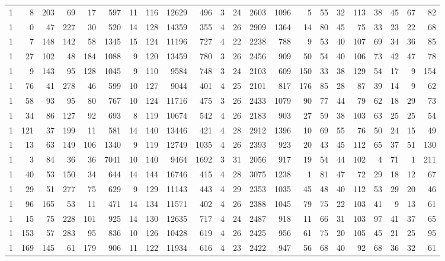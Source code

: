{\begin{landscape}
\begin{longtable}[c]{lrrrrrrrrrrrrrrrrrrrrr}
1 & 8 & 203 & 69 & 17 & 597 & 11 & 116 & 12629 & 496 & 3 & 24 & 2603 & 1096 & 5 & 55 & 32 & 113 & 38 & 45 & 67 & 82 \\
1 & 0 & 47 & 227 & 30 & 520 & 14 & 128 & 14359 & 355 & 4 & 26 & 2909 & 1364 & 14 & 80 & 45 & 75 & 33 & 23 & 22 & 68 \\
1 & 7 & 148 & 142 & 58 & 1345 & 15 & 124 & 11196 & 727 & 4 & 22 & 2238 & 788 & 9 & 53 & 40 & 107 & 69 & 34 & 36 & 85 \\
1 & 27 & 102 & 48 & 184 & 1088 & 9 & 120 & 13459 & 780 & 3 & 26 & 2456 & 909 & 50 & 54 & 40 & 106 & 73 & 42 & 47 & 78 \\
1 & 9 & 143 & 95 & 128 & 1045 & 9 & 110 & 9584 & 748 & 3 & 24 & 2103 & 609 & 150 & 33 & 38 & 129 & 54 & 17 & 9 & 154 \\
1 & 76 & 41 & 278 & 46 & 599 & 10 & 127 & 9044 & 401 & 4 & 25 & 2101 & 817 & 176 & 85 & 28 & 87 & 39 & 14 & 9 & 62 \\
1 & 58 & 93 & 95 & 80 & 767 & 10 & 124 & 11716 & 475 & 3 & 26 & 2433 & 1079 & 90 & 77 & 44 & 79 & 62 & 18 & 29 & 73 \\
1 & 34 & 86 & 127 & 92 & 693 & 8 & 119 & 10674 & 542 & 4 & 26 & 2183 & 903 & 27 & 59 & 38 & 103 & 63 & 25 & 25 & 54 \\
1 & 121 & 37 & 199 & 11 & 581 & 14 & 140 & 13446 & 421 & 4 & 28 & 2912 & 1396 & 10 & 69 & 55 & 76 & 50 & 24 & 15 & 49 \\
1 & 13 & 63 & 149 & 106 & 1340 & 9 & 119 & 12749 & 1035 & 4 & 26 & 2393 & 923 & 20 & 43 & 45 & 112 & 65 & 37 & 51 & 130 \\
1 & 3 & 84 & 36 & 36 & 7041 & 10 & 140 & 9464 & 1692 & 3 & 31 & 2056 & 917 & 19 & 54 & 44 & 102 & 4 & 71 & 1 & 211 \\
1 & 40 & 53 & 150 & 34 & 644 & 14 & 144 & 16746 & 415 & 4 & 28 & 3075 & 1238 & 1 & 81 & 47 & 72 & 29 & 18 & 12 & 67 \\
1 & 29 & 51 & 277 & 75 & 629 & 9 & 129 & 11143 & 443 & 4 & 29 & 2353 & 1035 & 45 & 48 & 40 & 112 & 53 & 29 & 20 & 46 \\
1 & 96 & 165 & 53 & 11 & 471 & 14 & 134 & 11571 & 402 & 4 & 26 & 2388 & 1045 & 79 & 75 & 22 & 103 & 41 & 9 & 13 & 61 \\
1 & 15 & 75 & 228 & 101 & 925 & 14 & 130 & 12635 & 717 & 4 & 24 & 2487 & 918 & 11 & 66 & 31 & 103 & 97 & 41 & 37 & 65 \\
1 & 153 & 57 & 283 & 95 & 836 & 10 & 126 & 10428 & 619 & 4 & 26 & 2425 & 956 & 61 & 75 & 20 & 105 & 45 & 21 & 25 & 95 \\
1 & 169 & 145 & 61 & 179 & 906 & 11 & 122 & 11934 & 616 & 4 & 23 & 2422 & 947 & 56 & 68 & 40 & 92 & 68 & 36 & 32 & 61 \\

\end{longtable}
\end{landscape}}
